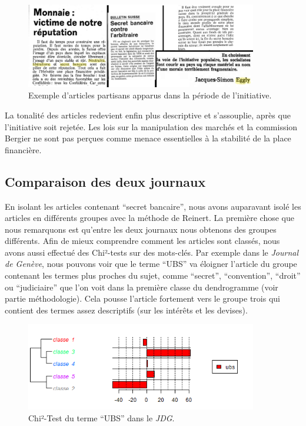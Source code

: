 \documentclass[a4paper, 11pt]{article}
\begin{document}
\begin{figure}
\centering
\includegraphics[width=0.9\textwidth ]{analysis/propaganda_collage.png}
\caption{\label{propagande} Exemple d'articles partisans apparus dans la
période de l'initiative.}
\end{figure}

La tonalité des articles redevient enfin plus descriptive et
s'assouplie, après que l'initiative soit rejetée. Les lois sur la
manipulation des marchés et la commission Bergier ne sont pas perçues
comme menace essentielles à la stabilité de la place financière.

\hypertarget{comparaison-des-deux-journaux}{%
\subsection{Comparaison des deux
journaux}\label{comparaison-des-deux-journaux}}

En isolant les articles contenant ``secret bancaire'', nous avons
auparavant isolé les articles en différents groupes avec la méthode de
Reinert. La première chose que nous remarquons est qu'entre les deux
journaux nous obtenons des groupes différents. Afin de mieux comprendre
comment les articles sont classés, nous avons aussi effectué des
Chi²-tests sur des mots-clés. Par exemple dans le \emph{Journal de
Genève}, nous pouvons voir que le terme ``UBS'' va éloigner l'article du
groupe contenant les termes plus proches du sujet, comme ``secret'',
``convention'', ``droit'' ou ``judiciaire'' que l'on voit dans la
première classe du dendrogramme (voir partie méthodologie). Cela pousse
l'article fortement vers le groupe trois qui contient des termes assez
descriptifs (sur les intérêts et les devises).

\begin{figure}
\centering
\includegraphics[width=0.9\textwidth ]{analysis/chiubs.png}
\caption{Chi²-Test du terme ``UBS'' dans le \emph{JDG}.}
\end{figure}
\end{document}

